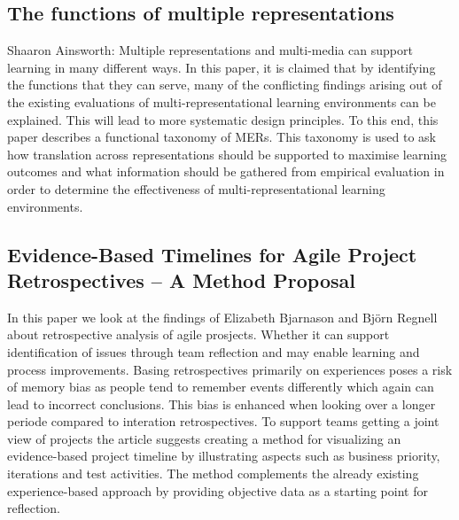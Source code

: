 \subsection{The functions of multiple representations}\cite{Ainsworth1999}
Shaaron Ainsworth: Multiple representations and multi-media can support learning in many different ways. In this paper, it is claimed that by identifying the functions that they can serve, many of the conflicting findings arising out of the existing evaluations of multi-representational learning environments can be explained. This will lead to more systematic design principles. To this end, this paper describes a functional taxonomy of MERs. This taxonomy is used to ask how translation across representations should be supported to maximise learning outcomes and what information should be gathered from empirical evaluation in order to determine the effectiveness of multi-representational learning environments.

\subsection{Evidence-Based Timelines for Agile Project Retrospectives – A Method Proposal}\cite{Bjarnason2012}
In this paper we look at the findings of Elizabeth Bjarnason and Björn Regnell about retrospective analysis of agile prosjects. Whether it can support identification of issues through team reflection and may enable learning and process improvements. Basing retrospectives primarily on experiences poses a risk of memory bias as people tend to remember events differently which again can lead to incorrect conclusions. This bias is enhanced when looking over a longer periode compared to interation retrospectives. To support teams getting a joint view of projects the article suggests creating a method for visualizing an evidence-based project timeline by illustrating aspects such as business priority, iterations and test activities. The method complements the already existing experience-based approach by providing objective data as a starting point for reflection.
